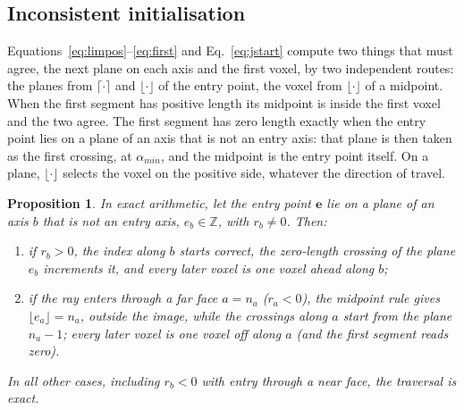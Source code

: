 \documentclass[11pt,a4paper]{article}
\newtheorem{proposition}{Proposition}
\theoremstyle{remark}
\newcommand{\e}{\mathbf{e}}
\begin{document}
\subsection{Inconsistent initialisation}
\label{sec:init}

Equations~\eqref{eq:limpos}--\eqref{eq:first} and Eq.~\eqref{eq:jstart} compute two things that must
agree, the next plane on each axis and the first voxel, by two independent routes: the planes from
$\lceil\cdot\rceil$ and $\lfloor\cdot\rfloor$ of the entry point, the voxel from $\lfloor\cdot\rfloor$ of a
midpoint. When the first segment has positive length its midpoint is inside the first voxel and the two
agree. The first segment has zero length exactly when the entry point lies on a plane of an axis that is
not an entry axis: that plane is then taken as the first crossing, at $\alpha_{min}$, and the midpoint is
the entry point itself. On a plane, $\lfloor\cdot\rfloor$ selects the voxel on the positive side, whatever
the direction of travel.

\begin{proposition}\label{prop:jacobs}
In exact arithmetic, let the entry point $\e$ lie on a plane of an axis $b$ that is not an entry
axis, $e_b\in\mathbb{Z}$, with $r_b\neq0$. Then:
\begin{enumerate}
\item[(i)] if $r_b>0$, the index along $b$ starts correct, the zero-length crossing of the plane
$e_b$ increments it, and every later voxel is one voxel ahead along $b$;
\item[(ii)] if the ray enters through a far face $a=n_a$ ($r_a<0$), the midpoint rule gives
$\lfloor e_a\rfloor=n_a$, outside the image, while the crossings along $a$ start from the plane
$n_a-1$; every later voxel is one voxel off along $a$ (and the first segment reads zero).
\end{enumerate}
In all other cases, including $r_b<0$ with entry through a near face, the traversal is exact.
\end{proposition}
\end{document}
